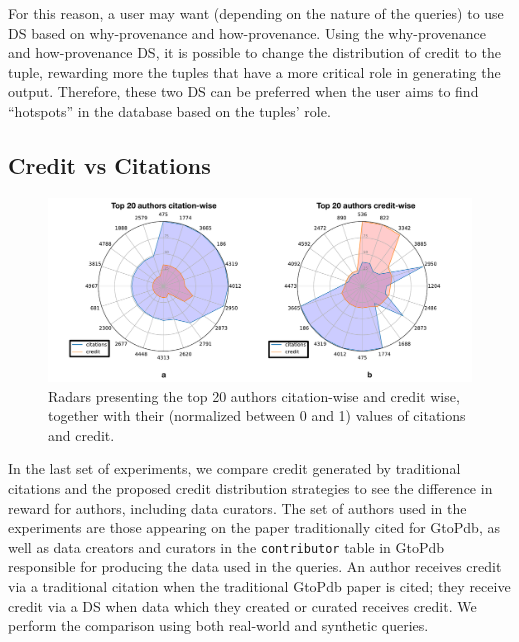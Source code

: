 For this reason, a user may want (depending on the nature of the queries) to use DS based on why-provenance and how-provenance. %
Using the why-provenance and how-provenance DS, it is possible to change the distribution of credit to the tuple, rewarding more the tuples that have a more critical role in generating the output. Therefore, these two DS can be preferred when the user aims to find ``hotspots'' in the database based on the tuples' role. 



\subsection{Credit vs Citations}

\begin{figure}[]
\centering
  \includegraphics[width=1\textwidth]{figures/2_radars}
  \caption{Radars presenting the top 20 authors citation-wise and credit wise, together with their (normalized between 0 and 1) values of citations and credit.}
  \label{figure:2_radars}
\end{figure}


In the last set of experiments, we compare credit generated by traditional citations and the proposed credit distribution strategies to see the difference in reward for authors, including data curators.  
The set of authors used in the experiments are  those appearing on the paper traditionally cited for GtoPdb, as well as data creators and curators in the \texttt{contributor} table in GtoPdb responsible for producing the data used in the queries.  An author receives credit via a traditional citation when the traditional GtoPdb paper is cited; they receive credit via a DS when data which they created or curated receives credit.
We perform the comparison using both real-world and synthetic queries.

